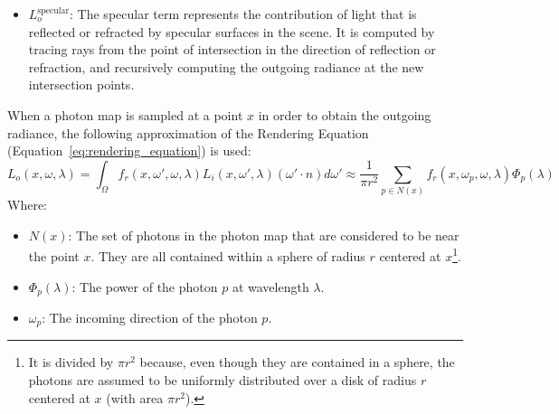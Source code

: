 \begin{itemize}
    \item $L_o^{\text{specular}}$: The specular term represents the contribution of light that is reflected or refracted by specular surfaces in the scene. It is computed by tracing rays from the point of intersection in the direction of reflection or refraction, and recursively computing the outgoing radiance at the new intersection points.
\end{itemize}


When a photon map is sampled at a point $x$ in order to obtain the outgoing radiance, the following approximation of the Rendering Equation (Equation~\ref{eq:rendering_equation}) is used:
\begin{equation*}
    L_o(x, \omega, \lambda) = \int_{\Omega} f_r(x, \omega', \omega, \lambda) L_i(x, \omega', \lambda) (\omega' \cdot n) d\omega' \approx \frac{1}{\pi r^2} \sum_{p\in N(x)} f_r(x, \omega_p, \omega, \lambda) \Phi_p(\lambda)
\end{equation*}
Where:
\begin{itemize}
    \item $N(x)$: The set of photons in the photon map that are considered to be near the point $x$. They are all contained within a sphere of radius $r$ centered at $x$\footnote{It is divided by $\pi r^2$ because, even though they are contained in a sphere, the photons are assumed to be uniformly distributed over a disk of radius $r$ centered at $x$ (with area $\pi r^2$).}.
    \item $\Phi_p(\lambda)$: The power of the photon $p$ at wavelength $\lambda$.
    \item $\omega_p$: The incoming direction of the photon $p$.
\end{itemize}

